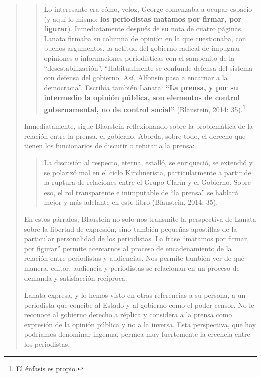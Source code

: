 \begin{quote}
\begin{quote}
	Lo interesante era cómo, veloz, George comenzaba a ocupar espacio (y aquí lo mismo: \textbf{los periodistas matamos por firmar, por figurar}). Inmediatamente después de su nota de cuatro páginas, Lanata firmaba su columna de opinión  en la que cuestionaba, con buenos argumentos, la actitud del gobierno radical de impugnar opiniones o informaciones periodísticas con el sambenito de la \enquote{desestabilización}. \enquote{Habitualmente  se confunde defensa del sistema con defensa del gobierno. Así, Alfonsín pasa a encarnar a la democracia}. Escribía también Lanata: \textbf{\enquote{La prensa, y por su intermedio la opinión pública, son elementos de control gubernamental, no de control social}} (Blaustein, 2014: 35).\footnote{El énfasis es propio.}
\end{quote}


Inmediatamente, sigue Blaustein reflexionando sobre la problemática de la relación entre la prensa, el gobierno. Aborda, sobre todo, el derecho que tienen los funcionarios de discutir o refutar a la prensa:

\begin{quote}
	La discusión al respecto, eterna, estalló, se enriqueció, se extendió y se polarizó mal en el ciclo Kirchnerista, particularmente a partir de la ruptura de relaciones entre el Grupo Clarín y el Gobierno. Sobre eso, el rol transparente e inimputable de \enquote{la prensa} se hablará mejor y más adelante en este libro (Blaustein, 2014: 35).
\end{quote}


En estos párrafos, Blaustein no solo nos transmite la perspectiva de Lanata sobre la libertad de expresión, sino también pequeñas apostillas de la particular personalidad de los periodistas. La frase \enquote{matamos por firmar, por figurar}  permite acercarnos al proceso de encadenamiento de la relación entre periodistas y audiencias. Nos permite también ver de qué manera, editor, audiencia y periodistas se relacionan en un proceso de demanda y satisfacción recíproca.

Lanata expresa, y lo hemos visto en otras referencias a su persona, a un periodista que concibe al Estado y al gobierno como el poder censor. No le reconoce al gobierno derecho a réplica y considera a la prensa como expresión de la opinión pública y no a la inversa. Esta perspectiva, que hoy podríamos denominar ingenua, permea muy fuertemente la creencia entre los periodistas.


\end{quote}
